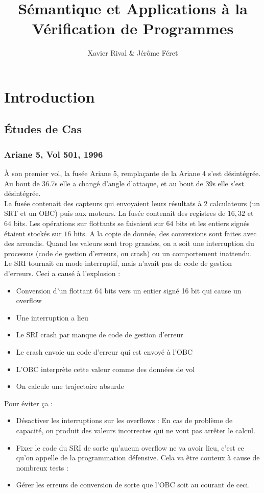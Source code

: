 \documentclass{cours}
\title{Sémantique et Applications à la Vérification de Programmes}
\author{Xavier Rival \& Jérôme Féret}
\begin{document}
\section{Introduction}
\subsection{Études de Cas}
\subsubsection{Ariane 5, Vol 501, 1996}
À son premier vol, la fusée Ariane 5, remplaçante de la Ariane 4 s'est désintégrée. Au bout de 36.7s elle a changé d'angle d'attaque, et au bout de 39s elle s'est désintégrée.\\
La fusée contenait des capteurs qui envoyaient leurs résultats à 2 calculateurs (un SRT et un OBC) puis aux moteurs. La fusée contenait des registres de $16, 32$ et $64$ bits. Les opérations sur flottants se faisaient sur $64$ bits et les entiers signés étaient stockés sur $16$ bits. A la copie de donnée, des conversions sont faites avec des arrondis. Quand les valeurs sont trop grandes, on a soit une interruption du processus (code de gestion d'erreurs, ou crash) ou un comportement inattendu. Le SRI tournait en mode interruptif, mais n'avait pas de code de gestion d'erreurs. Ceci a causé à l'explosion : 
\begin{itemize}
    \item Conversion d'un flottant 64 bits vers un entier signé 16 bit qui cause un overflow
    \item Une interruption a lieu
    \item Le SRI crash par manque de code de gestion d'erreur
    \item Le crash envoie un code d'erreur qui est envoyé à l'OBC
    \item L'OBC interprète cette valeur comme des données de vol
    \item On calcule une trajectoire absurde
\end{itemize}

Pour éviter ça : 
\begin{itemize}
    \item Désactiver les interruptions sur les overflows : En cas de problème de capacité, on produit des valeurs incorrectes qui ne vont pas arrêter le calcul. 
    \item Fixer le code du SRI de sorte qu'aucun overflow ne va avoir lieu, c'est ce qu'on appelle de la programmation défensive. Cela va être couteux à cause de nombreux tests : 
    \item Gérer les erreurs de conversion de sorte que l'OBC soit au courant de ceci. 
\end{itemize}
\end{document}
